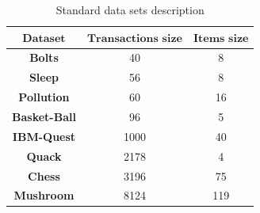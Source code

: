 \documentclass[preprint,12pt]{elsarticle}
\begin{document}
\begin{table}[htbp]
\small
\label{datas}
\caption{Standard data sets description}
\begin{center}
\begin{tabular}{c c c}
\toprule
$\textbf{Dataset}$&$\textbf{Transactions size}$&$\textbf{Items size}$\\\hline
\textbf{Bolts}	&40	&8\\\hline
\textbf{Sleep}	&56	&8\\\hline
\textbf{Pollution}	&60	&16\\\hline
\textbf{Basket-Ball}	&96	&5	\\\hline
\textbf{IBM-Quest}	&1000	&40	\\\hline
\textbf{Quack}	&2178	&4	\\\hline
\textbf{Chess}	&3196	&75	\\\hline
\textbf{Mushroom}	&8124	&119 	\\\hline
\bottomrule
\end{tabular}
\end{center}
\end{table}
\end{document}
